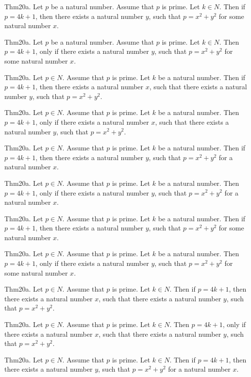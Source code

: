 \documentclass{article}
\begin{document}
Thm20a. Let $p$ be a natural number. Assume that $p$ is prime. Let $k \in N$. Then if $p = 4 k + 1$, then there exists a natural number $y$, such that $p = x ^{ 2}+ y ^{ 2}$ for some natural number $x$.

Thm20a. Let $p$ be a natural number. Assume that $p$ is prime. Let $k \in N$. Then $p = 4 k + 1$, only if there exists a natural number $y$, such that $p = x ^{ 2}+ y ^{ 2}$ for some natural number $x$.

Thm20a. Let $p \in N$. Assume that $p$ is prime. Let $k$ be a natural number. Then if $p = 4 k + 1$, then there exists a natural number $x$, such that there exists a natural number $y$, such that $p = x ^{ 2}+ y ^{ 2}$.

Thm20a. Let $p \in N$. Assume that $p$ is prime. Let $k$ be a natural number. Then $p = 4 k + 1$, only if there exists a natural number $x$, such that there exists a natural number $y$, such that $p = x ^{ 2}+ y ^{ 2}$.

Thm20a. Let $p \in N$. Assume that $p$ is prime. Let $k$ be a natural number. Then if $p = 4 k + 1$, then there exists a natural number $y$, such that $p = x ^{ 2}+ y ^{ 2}$ for a natural number $x$.

Thm20a. Let $p \in N$. Assume that $p$ is prime. Let $k$ be a natural number. Then $p = 4 k + 1$, only if there exists a natural number $y$, such that $p = x ^{ 2}+ y ^{ 2}$ for a natural number $x$.

Thm20a. Let $p \in N$. Assume that $p$ is prime. Let $k$ be a natural number. Then if $p = 4 k + 1$, then there exists a natural number $y$, such that $p = x ^{ 2}+ y ^{ 2}$ for some natural number $x$.

Thm20a. Let $p \in N$. Assume that $p$ is prime. Let $k$ be a natural number. Then $p = 4 k + 1$, only if there exists a natural number $y$, such that $p = x ^{ 2}+ y ^{ 2}$ for some natural number $x$.

Thm20a. Let $p \in N$. Assume that $p$ is prime. Let $k \in N$. Then if $p = 4 k + 1$, then there exists a natural number $x$, such that there exists a natural number $y$, such that $p = x ^{ 2}+ y ^{ 2}$.

Thm20a. Let $p \in N$. Assume that $p$ is prime. Let $k \in N$. Then $p = 4 k + 1$, only if there exists a natural number $x$, such that there exists a natural number $y$, such that $p = x ^{ 2}+ y ^{ 2}$.

Thm20a. Let $p \in N$. Assume that $p$ is prime. Let $k \in N$. Then if $p = 4 k + 1$, then there exists a natural number $y$, such that $p = x ^{ 2}+ y ^{ 2}$ for a natural number $x$.
\end{document}
